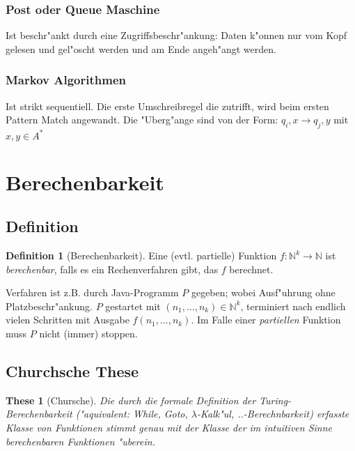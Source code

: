 \documentclass[german, 10pt, a4paper, twocolumn]{scrartcl}
\newtheorem{these}{These}[section]
\theoremstyle{definition}
\newtheorem*{definition}{Definition}
\theoremstyle{example}
\begin{document}
\subsubsection{Post oder Queue Maschine}

Ist beschr"ankt durch eine Zugriffsbeschr"ankung: Daten k"onnen nur vom Kopf gelesen und gel"oscht werden und am Ende angeh"angt werden.

\subsubsection{Markov Algorithmen}

Ist strikt sequentiell. Die erste Umschreibregel die zutrifft, wird beim ersten Pattern Match angewandt. Die "Uberg"ange sind von der Form: $q_i, x \rightarrow q_j, y$ mit $x,y \in A^*$

\section{Berechenbarkeit}

\subsection{Definition}

\begin{definition}[Berechenbarkeit]
	Eine (evtl. partielle) Funktion $f: \mathbb{N}^k \to \mathbb{N}$ ist \textit{berechenbar}, falls es ein Rechenverfahren gibt, das $f$ berechnet.
\end{definition}

Verfahren ist z.B. durch Java-Programm $P$ gegeben; wobei Ausf"uhrung ohne Platzbeschr"ankung. $P$ gestartet mit $(n_1,\ldots,n_k)\in \mathbb{N}^k$, terminiert nach endlich vielen Schritten mit Ausgabe $f(n_1,\ldots,n_k)$. Im Falle einer \textit{partiellen} Funktion muss $P$ nicht (immer) stoppen.

\subsection{Churchsche These}

\begin{these}[Chursche]
	Die durch die formale Definition der Turing-Berechenbarkeit ("aquivalent: While, Goto, $\lambda$-Kalk"ul, ..-Berechnbarkeit) erfasste Klasse von Funktionen stimmt genau mit der Klasse der im intuitiven Sinne berechenbaren Funktionen "uberein.
\end{these}
\end{document}
